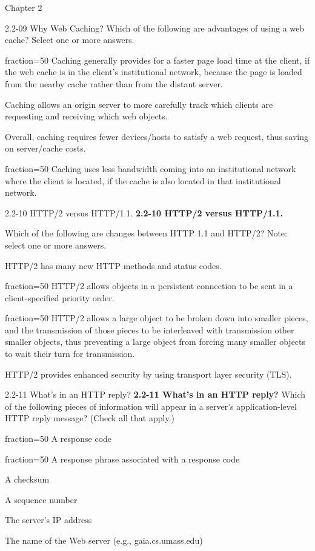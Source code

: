 \documentclass[a4paper]{article}
\begin{document}
\begin{quiz}{Chapter 2}
\begin{multi}[points=1,shuffle,multiple]{2.2-09 Why Web Caching?}
Which of the following are advantages of using a web cache? Select one or more answers.

\item[fraction=50] Caching generally provides for a faster page load time at the client, if the web cache is in the client's institutional network, because the page is loaded from the nearby cache rather than from the distant server.
\item Caching allows an origin server to more carefully track which clients are requesting and receiving which web objects.
\item Overall, caching requires fewer devices/hosts to satisfy a web request, thus saving on server/cache costs.
\item[fraction=50] Caching uses less bandwidth coming into an institutional network where the client is located, if the cache is also located in that institutional network.
\end{multi}

\begin{multi}[points=1,shuffle,multiple]{2.2-10 HTTP/2 versus HTTP/1.1.}
\textbf{2.2-10 HTTP/2 versus HTTP/1.1.}  

Which of the following are changes between HTTP 1.1 and HTTP/2? Note: select one or more answers.
\item HTTP/2 has many new HTTP methods and status codes.
\item[fraction=50] HTTP/2 allows objects in a persistent connection to be sent in a client-specified priority order. 
\item[fraction=50] HTTP/2 allows a large object to be broken down into smaller pieces, and the transmission of those pieces to be interleaved with transmission other smaller objects, thus preventing a large object from forcing many smaller objects to wait their turn for transmission.
\item HTTP/2 provides enhanced security by using transport layer security (TLS).
\end{multi}

\begin{multi}[points=1,shuffle,multiple]{2.2-11 What's in an HTTP reply?}
\textbf{2.2-11 What's in an HTTP reply?} 
Which of the following pieces of information will appear in a server's application-level HTTP reply message? (Check all that apply.)
\item[fraction=50] A response code
\item[fraction=50] A response phrase associated with a response code
\item A checksum
\item A sequence number
\item The server's IP address
\item The name of the Web server (e.g., gaia.cs.umass.edu)
\end{multi}


\end{quiz}
\end{document}
